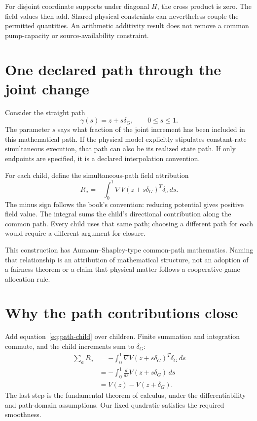 For disjoint coordinate supports under diagonal $H$, the cross product is zero. The field values then add. Shared physical constraints can nevertheless couple the permitted quantities. An arithmetic additivity result does not remove a common pump-capacity or source-availability constraint.

\section{One declared path through the joint change}
Consider the straight path
\begin{equation}
 \gamma(s)=z+s\delta_G,\qquad 0\le s\le1.
\end{equation}
The parameter $s$ says what fraction of the joint increment has been included in this mathematical path. If the physical model explicitly stipulates constant-rate simultaneous execution, that path can also be its realized state path. If only endpoints are specified, it is a declared interpolation convention.

For each child, define the simultaneous-path field attribution
\begin{equation}\label{eq:path-child}
 R_a=-\int_0^1\nabla V(z+s\delta_G)^T\delta_a\,ds.
\end{equation}
The minus sign follows the book's convention: reducing potential gives positive field value. The integral sums the child's directional contribution along the common path. Every child uses that same path; choosing a different path for each would require a different argument for closure.

This construction has Aumann--Shapley-type common-path mathematics. Naming that relationship is an attribution of mathematical structure, not an adoption of a fairness theorem or a claim that physical matter follows a cooperative-game allocation rule.

\section{Why the path contributions close}
Add equation~\eqref{eq:path-child} over children. Finite summation and integration commute, and the child increments sum to $\delta_G$:
\begin{align}
 \sum_aR_a
 &=-\int_0^1\nabla V(z+s\delta_G)^T\delta_G\,ds\\
 &=-\int_0^1\frac{d}{ds}V(z+s\delta_G)\,ds\\
 &=V(z)-V(z+\delta_G).
\end{align}
The last step is the fundamental theorem of calculus, under the differentiability and path-domain assumptions. Our fixed quadratic satisfies the required smoothness.

